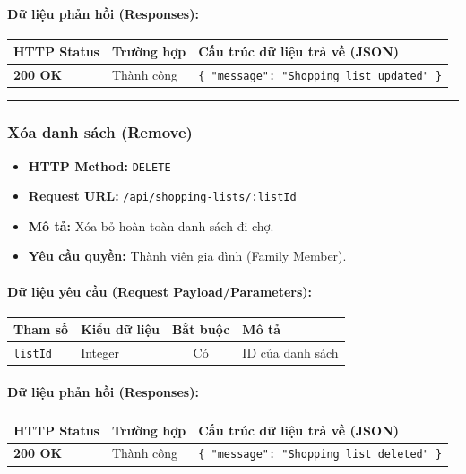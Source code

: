 \documentclass[12pt,a4paper]{article}
\begin{document}
\paragraph{Dữ liệu phản hồi (Responses):}
\begin{longtable}{|p{2.8cm}|p{3.2cm}|p{8.0cm}|}
\hline
\textbf{HTTP Status} & \textbf{Trường hợp} & \textbf{Cấu trúc dữ liệu trả về (JSON)} \\ \hline
\endhead
\textbf{200 OK} & Thành công & \texttt{\{ "message": "Shopping list updated" \}} \\ \hline
\end{longtable}

\vskip 0.4cm
\noindent\rule{\textwidth}{0.3pt}
\vskip 0.4cm

\subsubsection{Xóa danh sách (Remove)}
\begin{itemize}[leftmargin=*]
    \item \textbf{HTTP Method:} \texttt{DELETE}
    \item \textbf{Request URL:} \texttt{/api/shopping-lists/:listId}
    \item \textbf{Mô tả:} Xóa bỏ hoàn toàn danh sách đi chợ.
    \item \textbf{Yêu cầu quyền:} Thành viên gia đình (Family Member).
\end{itemize}

\paragraph{Dữ liệu yêu cầu (Request Payload/Parameters):}
\begin{longtable}{|p{2.8cm}|p{2.2cm}|c|p{7.0cm}|}
\hline
\textbf{Tham số} & \textbf{Kiểu dữ liệu} & \textbf{Bắt buộc} & \textbf{Mô tả} \\ \hline
\endhead
\texttt{listId} & Integer & Có & ID của danh sách \\ \hline
\end{longtable}

\paragraph{Dữ liệu phản hồi (Responses):}
\begin{longtable}{|p{2.8cm}|p{3.2cm}|p{8.0cm}|}
\hline
\textbf{HTTP Status} & \textbf{Trường hợp} & \textbf{Cấu trúc dữ liệu trả về (JSON)} \\ \hline
\endhead
\textbf{200 OK} & Thành công & \texttt{\{ "message": "Shopping list deleted" \}} \\ \hline
\end{longtable}
\end{document}
